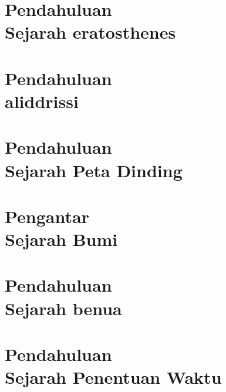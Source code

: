 \documentclass{WileySix}
\begin{document}
\chapter[Sejarah eratosthenes]
{Pendahuluan\\ Sejarah eratosthenes}



\chapter[Sejarah aliddrissi]
{Pendahuluan\\ aliddrissi}


\chapter[Sejarah Peta Dinding]
{Pendahuluan\\ Sejarah Peta Dinding}


\chapter[Sejarah Bumi]
{Pengantar\\ Sejarah Bumi}


%

%

\chapter[Sejarah Benua]
{Pendahuluan\\ Sejarah benua}


\chapter[Sejarah Penentuan Waktu]
{Pendahuluan\\ Sejarah Penentuan Waktu}

\end{document}
